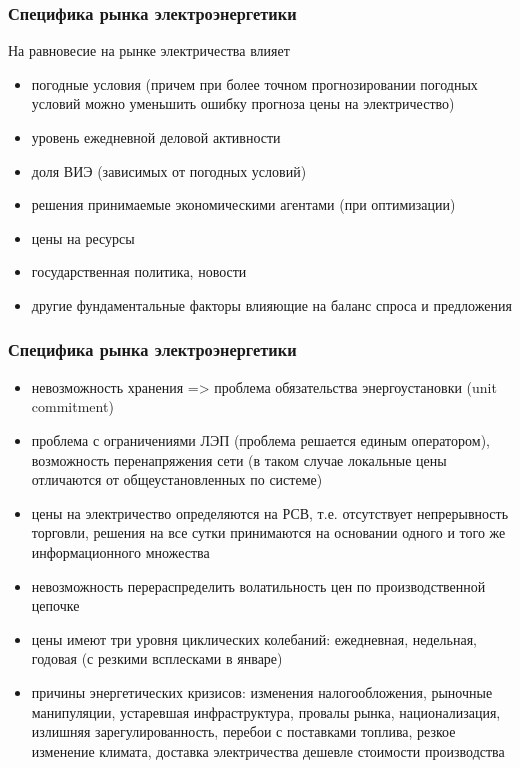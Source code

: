 \documentclass[c, dvipsnames]{beamer}  %
\begin{document}
\begin{frame}[shrink=5]
\frametitle{Специфика рынка электроэнергетики} 

На равновесие на рынке  электричества влияет 

\begin{itemize}
	\item  погодные условия (причем при более точном прогнозировании погодных условий можно уменьшить ошибку прогноза цены на электричество)
	\item  уровень ежедневной деловой активности 
	\item  доля ВИЭ (зависимых от погодных условий) 
	\item  решения принимаемые  экономическими агентами (при оптимизации)
	\item  цены на ресурсы
	\item  государственная политика, новости
	\item  другие фундаментальные факторы влияющие на баланс спроса и предложения
\end{itemize}

\end{frame}




\begin{frame}[shrink=5]
\frametitle{Специфика рынка электроэнергетики} 

\begin{itemize}
	\item невозможность хранения => проблема обязательства энергоустановки (unit commitment)
	\item проблема с ограничениями ЛЭП (проблема решается единым оператором), возможность перенапряжения сети (в таком случае локальные цены отличаются от общеустановленных по системе) 
	\item цены на электричество определяются на РСВ, т.е. отсутствует непрерывность торговли, решения на все сутки принимаются на основании одного и того же информационного множества
	\item невозможность перераспределить волатильность цен по производственной цепочке 
	\item  цены имеют три уровня циклических колебаний: ежедневная, недельная, годовая (с резкими всплесками в январе)
	\item причины энергетических кризисов: изменения налогообложения, рыночные манипуляции, устаревшая инфраструктура, провалы рынка, национализация, излишняя зарегулированность, перебои с поставками топлива, резкое изменение климата,  доставка электричества дешевле стоимости производства 
	
\end{itemize}


\end{frame}
\end{document}

